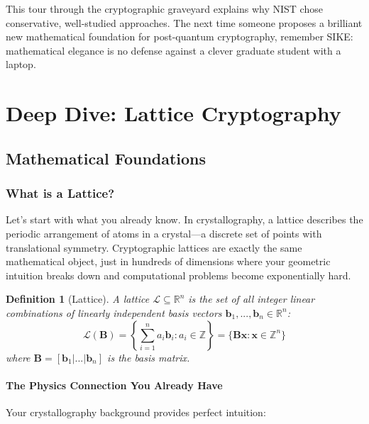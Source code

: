 \documentclass[11pt,a4paper]{article}
\newtheorem{definition}{Definition}
\begin{document}
This tour through the cryptographic graveyard explains why NIST chose conservative, well-studied approaches. The next time someone proposes a brilliant new mathematical foundation for post-quantum cryptography, remember SIKE: mathematical elegance is no defense against a clever graduate student with a laptop.


\section{Deep Dive: Lattice Cryptography}
\label{sec:lattices}

\subsection{Mathematical Foundations}
\label{sec:lattice-math}

\subsubsection{What is a Lattice?}

Let's start with what you already know. In crystallography, a lattice describes the periodic arrangement of atoms in a crystal—a discrete set of points with translational symmetry. Cryptographic lattices are exactly the same mathematical object, just in hundreds of dimensions where your geometric intuition breaks down and computational problems become exponentially hard.

\begin{definition}[Lattice]
A lattice $\mathcal{L} \subseteq \mathbb{R}^n$ is the set of all integer linear combinations of linearly independent basis vectors $\mathbf{b}_1, ..., \mathbf{b}_n \in \mathbb{R}^n$:
$$\mathcal{L}(\mathbf{B}) = \left\{ \sum_{i=1}^n a_i \mathbf{b}_i : a_i \in \mathbb{Z} \right\} = \{\mathbf{B}\mathbf{x} : \mathbf{x} \in \mathbb{Z}^n\}$$
where $\mathbf{B} = [\mathbf{b}_1 | ... | \mathbf{b}_n]$ is the basis matrix.
\end{definition}

\paragraph{The Physics Connection You Already Have}

Your crystallography background provides perfect intuition:
\end{document}
